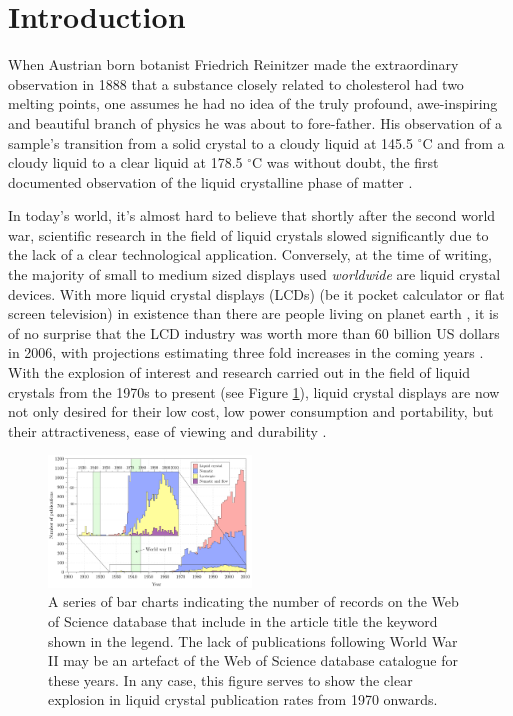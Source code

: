 \section{Introduction}

When Austrian born botanist Friedrich Reinitzer made the extraordinary observation in 1888 that a substance closely related to cholesterol had two melting points, one assumes he had no idea of the truly profound, awe-inspiring and beautiful branch of physics he was about to fore-father. His observation of a sample's transition from a solid crystal to a cloudy liquid at 145.5 $^{\circ}$C and from a cloudy liquid to a clear liquid at 178.5 $^{\circ}$C was without doubt, the first documented observation of the liquid crystalline phase of matter \citep{Reinitzer1888, Sluckin2004}.

In today's world, it's almost hard to believe that shortly after the second world war, scientific research in the field of liquid crystals slowed significantly due to the lack of a clear technological application. Conversely, at the time of writing, the majority of small to medium sized displays used \textit{worldwide} are liquid crystal devices. With more liquid crystal displays (LCDs) (be it pocket calculator or flat screen television) in existence than there are people living on planet earth \citep{Bruce2006}, it is of no surprise that the LCD industry was worth more than 60 billion US dollars in 2006, with projections estimating three fold increases in the coming years \citep{Bruce2006}. With the explosion of interest and research carried out in the field of liquid crystals from the 1970s to present (see Figure \ref{fig:web_of_science}), liquid crystal displays are now not only desired for their low cost, low power consumption and portability, but their attractiveness, ease of viewing and durability \citep{Collings1997}.

\begin{figure}
\begin{center}
\includegraphics[width=0.48\textwidth]{figures/introduction/publications.pdf}
\caption[History of publications in the field of liquid crystal science (Source: Web of knowledge)]{\label{fig:web_of_science}A series of bar charts indicating the number of records on the Web of Science database that include in the article title the keyword shown in the legend. The lack of publications following World War II may be an artefact of the Web of Science database catalogue for these years. In any case, this figure serves to show the clear explosion in liquid crystal publication rates from 1970 onwards.}
\end{center}
\end{figure}

